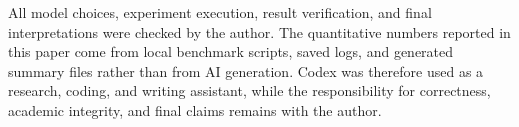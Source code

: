 \documentclass[10pt,twocolumn,letterpaper]{article}
\begin{document}
All model choices, experiment execution, result verification, and final interpretations were checked by the author.
The quantitative numbers reported in this paper come from local benchmark scripts, saved logs, and generated summary files rather than from AI generation.
Codex was therefore used as a research, coding, and writing assistant, while the responsibility for correctness, academic integrity, and final claims remains with the author.

{
    \small
    
    
}
\end{document}
